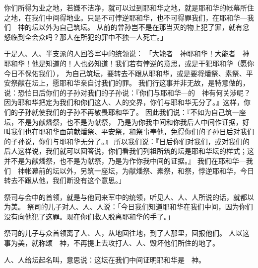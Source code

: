 {你们所得为业之地，若嫌不洁净，就可以过到耶和华之地，就是耶和华的帐幕所住之地，在我们中间得地业。只是不可悖逆耶和华，也不可得罪我们，在耶和华—我们　神的坛以外为自己筑坛。
从前{}的曾孙{}岂不是在那当灭的物上犯了罪，就有忿怒临到{}全会众吗？那人在所犯的罪中不独一人死亡。」
\par }{\PP {}于是{}人、{}人、{}半支派的人回答{}军中的统领说：
「大能者　神耶和华！大能者　神耶和华！他是知道的！{}人也必知道！我们若有悖逆的意思，或是干犯耶和华（愿你今日不保佑我们），
为自己筑坛，要转去不跟从耶和华，或是要将燔祭、素祭、平安祭献在坛上，愿耶和华亲自讨我们的罪。
我们行这事并非无故，是特意做的，说：恐怕日后你们的子孙对我们的子孙说：『你们与耶和华—{}的　神有何关涉呢？
因为耶和华把{}定为我们和你们这{}人、{}人的交界，你们与耶和华无分了。』这样，你们的子孙就使我们的子孙不再敬畏耶和华了。
因此我们说：『不如为自己筑一座坛，不是为献燔祭，也不是为献{}祭，
乃是为你我中间和你我后人中间作证据，好叫我们也在耶和华面前献燔祭、平安祭，和{}祭事奉他，免得你们的子孙日后对我们的子孙说，你们与耶和华无分了。』
所以我们说：『日后你们对我们，或对我们的后人这样说，我们就可以回答说，你们看我们列祖所筑的坛是耶和华坛的样式；这并不是为献燔祭，也不是为献{}祭，乃是为作你我中间的证据。』
我们在耶和华—我们　神帐幕前的坛以外，另筑一座坛，为献燔祭、素祭，和{}祭，悖逆耶和华，今日转去不跟从他，我们断没有这个意思。」
\par }{\PP {}祭司{}与会中的首领，就是与他同来{}军中的统领，听见{}人、{}人、{}人所说的话，就都以为美。
祭司{}的儿子{}对{}人、{}人、{}人说：「今日我们知道耶和华在我们中间，因为你们没有向他犯了这罪。现在你们救{}人脱离耶和华的手了。」
\par }{\PP {}祭司{}的儿子{}与众首领离了{}人、{}人，从{}地回往{}地，到了{}人那里，{}回报他们。
人以这事为美，就称颂　神，不再提上去攻打{}人、{}人、毁坏他们所住的地了。
\par }{\PP {}人、{}人给坛起名叫{}，意思说：这坛在我们中间证明耶和华是　神。

}
